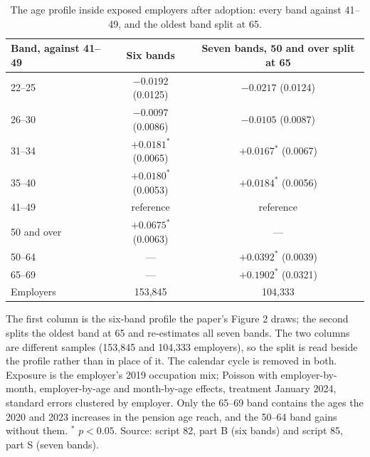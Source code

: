 \begin{table}[ht!]
\centering
\caption{The age profile inside exposed employers after adoption: every band against 41--49, and the oldest band split at 65.}
\label{tab:profile_bands}
\footnotesize
\begin{tabular}{lcc}
\toprule
Band, against 41--49 & Six bands & Seven bands, 50 and over split at 65 \\
\midrule
22--25 & $-0.0192$ (0.0125) & $-0.0217$ (0.0124) \\
26--30 & $-0.0097$ (0.0086) & $-0.0105$ (0.0087) \\
31--34 & $+0.0181^{*}$ (0.0065) & $+0.0167^{*}$ (0.0067) \\
35--40 & $+0.0180^{*}$ (0.0053) & $+0.0184^{*}$ (0.0056) \\
41--49 & reference & reference \\
50 and over & $+0.0675^{*}$ (0.0063) & --- \\
50--64 & --- & $+0.0392^{*}$ (0.0039) \\
65--69 & --- & $+0.1902^{*}$ (0.0321) \\
\midrule
Employers & 153{,}845 & 104{,}333 \\
\bottomrule
\end{tabular}
\begin{minipage}{0.92\textwidth}\footnotesize\vspace{4pt}
The first column is the six-band profile the paper's Figure 2 draws; the second splits the oldest band at 65 and re-estimates all seven bands. The two columns are different samples (153{,}845 and 104{,}333 employers), so the split is read beside the profile rather than in place of it. The calendar cycle is removed in both. Exposure is the employer's 2019 occupation mix; Poisson with employer-by-month, employer-by-age and month-by-age effects, treatment January 2024, standard errors clustered by employer. Only the 65--69 band contains the ages the 2020 and 2023 increases in the pension age reach, and the 50--64 band gains without them. $^{*}$ $p<0.05$. Source: script 82, part B (six bands) and script 85, part S (seven bands).
\end{minipage}
\end{table}
